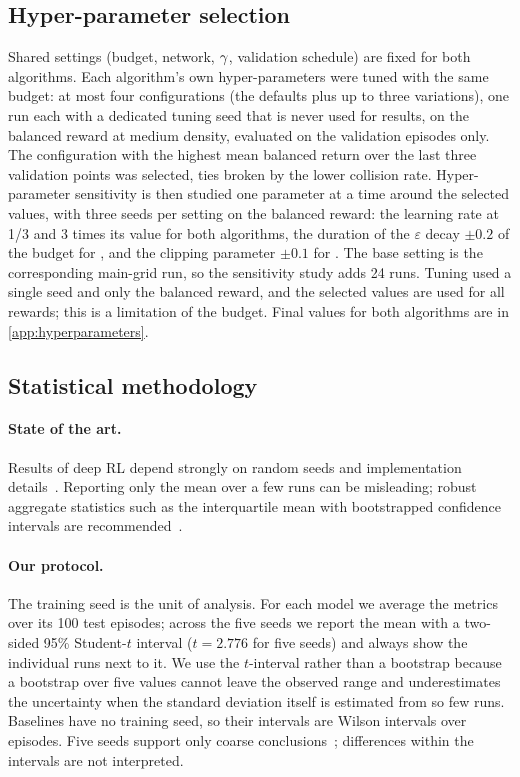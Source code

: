\subsection{Hyper-parameter selection}\label{sec:hp-selection}
Shared settings (budget, network, $\gamma$, validation schedule) are fixed for both algorithms. Each algorithm's own
hyper-parameters were tuned with the same budget: at most four configurations (the defaults plus up to three
variations), one run each with a dedicated tuning seed that is never used for results, on the balanced reward at
medium density, evaluated on the validation episodes only. The configuration with the highest mean balanced return
over the last three validation points was selected, ties broken by the lower collision rate. Hyper-parameter
sensitivity is then studied one parameter at a time around the selected values, with three seeds per setting on the
balanced reward: the learning rate at 1/3 and 3 times its value for both algorithms, the duration of the
$\varepsilon$ decay $\pm 0.2$ of the budget for \ddqn{}, and the clipping parameter $\pm 0.1$ for \ppo{}. The base
setting is the corresponding main-grid run, so the sensitivity study adds 24 runs. Tuning used a single seed and only the balanced reward, and the selected values are used for all
rewards; this is a limitation of the budget. Final values for both algorithms are in \cref{app:hyperparameters}.

\subsection{Statistical methodology}\label{sec:stats}
\paragraph{State of the art.}
Results of deep RL depend strongly on random seeds and implementation details~\cite{henderson2018matters}.
Reporting only the mean over a few runs can be misleading; robust aggregate statistics such as the interquartile
mean with bootstrapped confidence intervals are recommended~\cite{agarwal2021rliable}.

\paragraph{Our protocol.}
The training seed is the unit of analysis. For each model we average the metrics over its 100 test episodes; across
the five seeds we report the mean with a two-sided 95\% Student-$t$ interval ($t = 2.776$ for five seeds) and always
show the individual runs next to it. We use the $t$-interval rather than a bootstrap because a bootstrap over five
values cannot leave the observed range and underestimates the uncertainty when the standard deviation itself is
estimated from so few runs. Baselines have no training seed, so their intervals are Wilson intervals over episodes.
Five seeds support only coarse conclusions~\cite{patterson2024empirical}; differences within the intervals are not
interpreted.

